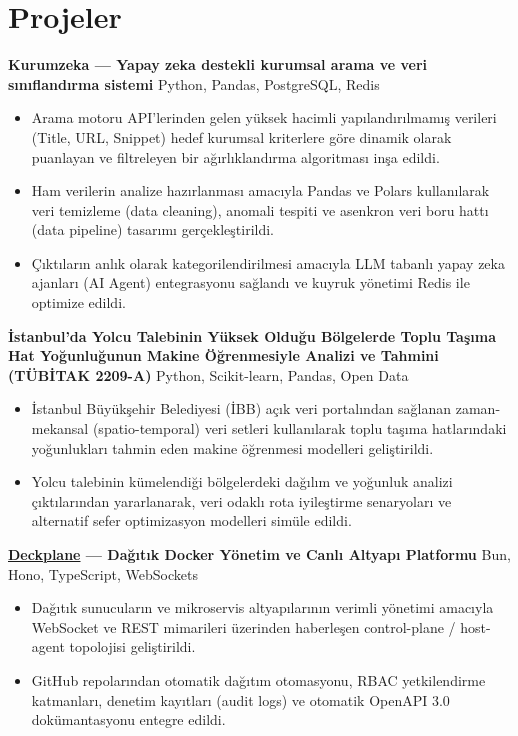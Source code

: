 \documentclass[10pt,a4paper]{extarticle}
\begin{document}
\section{Projeler}
\noindent\textbf{Kurumzeka --- Yapay zeka destekli kurumsal arama ve veri sınıflandırma sistemi} \hfill Python, Pandas, PostgreSQL, Redis\\
\begin{itemize}[leftmargin=*,noitemsep,topsep=2pt]
    \item Arama motoru API'lerinden gelen yüksek hacimli yapılandırılmamış verileri (Title, URL, Snippet) hedef kurumsal kriterlere göre dinamik olarak puanlayan ve filtreleyen bir ağırlıklandırma algoritması inşa edildi.
    \item Ham verilerin analize hazırlanması amacıyla Pandas ve Polars kullanılarak veri temizleme (data cleaning), anomali tespiti ve asenkron veri boru hattı (data pipeline) tasarımı gerçekleştirildi.
    \item Çıktıların anlık olarak kategorilendirilmesi amacıyla LLM tabanlı yapay zeka ajanları (AI Agent) entegrasyonu sağlandı ve kuyruk yönetimi Redis ile optimize edildi.
\end{itemize}

\noindent\textbf{İstanbul’da Yolcu Talebinin Yüksek Olduğu Bölgelerde Toplu Taşıma Hat Yoğunluğunun Makine Öğrenmesiyle Analizi ve Tahmini (TÜBİTAK 2209-A)} \hfill Python, Scikit-learn, Pandas, Open Data\\
\begin{itemize}[leftmargin=*,noitemsep,topsep=2pt]
    \item İstanbul Büyükşehir Belediyesi (İBB) açık veri portalından sağlanan zaman-mekansal (spatio-temporal) veri setleri kullanılarak toplu taşıma hatlarındaki yoğunlukları tahmin eden makine öğrenmesi modelleri geliştirildi.
    \item Yolcu talebinin kümelendiği bölgelerdeki dağılım ve yoğunluk analizi çıktılarından yararlanarak, veri odaklı rota iyileştirme senaryoları ve alternatif sefer optimizasyon modelleri simüle edildi.
\end{itemize}

\noindent\textbf{\href{https://deckplane.com}{Deckplane} --- Dağıtık Docker Yönetim ve Canlı Altyapı Platformu} \hfill Bun, Hono, TypeScript, WebSockets\\
\begin{itemize}[leftmargin=*,noitemsep,topsep=2pt]
    \item Dağıtık sunucuların ve mikroservis altyapılarının verimli yönetimi amacıyla WebSocket ve REST mimarileri üzerinden haberleşen control-plane / host-agent topolojisi geliştirildi.
    \item GitHub repolarından otomatik dağıtım otomasyonu, RBAC yetkilendirme katmanları, denetim kayıtları (audit logs) ve otomatik OpenAPI 3.0 dokümantasyonu entegre edildi.
\end{itemize}
\end{document}
